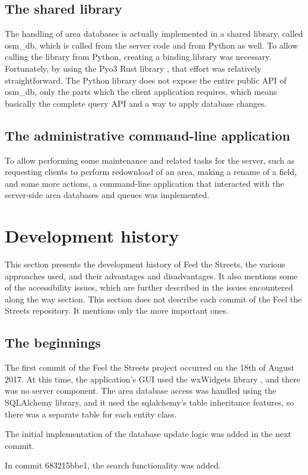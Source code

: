 \documentclass[nolof,digital]{fithesis3}
\begin{document}
\subsection{The shared library}
The handling of area databases is actually implemented in a shared library, called osm\_db, which is called from the server code and from Python as well. To allow calling the library from Python, creating a binding library was necessary. Fortunately, by using the Pyo3 Rust library \parencite{pyo3}, that effort was relatively straightforward. The Python library does not expose the entire public API of osm\_db, only the parts which the client application requires, which means basically the complete query API and a way to apply database changes.
\subsection{The administrative command-line application}
To allow performing some maintenance and related tasks for the server, such as requesting clients to perform redownload of an area, making a rename of a field, and some more actions, a command-line application that interacted with the server-side area databases and queues was implemented.
\section{Development history} \label{ref:devhistory}
This section presents the development history of Feel the Streets, the various approaches used, and their advantages and disadvantages. It also mentions some of the accessibility issues, which are further described in the issues encountered along the way section. This section does not describe each commit of the Feel the Streets repository. It mentions only the more important ones.
\subsection{The beginnings}
The first commit of the Feel the Streets project occurred on the 18th of August 2017. At this time, the application's GUI used the wxWidgets library \parencite{wx}, and there was no server component. The area database access was handled using the SQLAlchemy library, and it used the sqlalchemy's table inheritance features, so there was a separate table for each entity class.

The initial implementation of the database update logic was added in the next commit.

In commit 683215bbe1, the search functionality was added.
\end{document}
